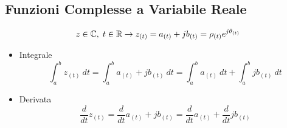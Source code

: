     \subsection{Funzioni Complesse a Variabile Reale}
        \[
           z \in \mathbb{C}, \hspace{0.1cm} t \in \mathbb{R} \rightarrow z_{(t)} = a_{(t)} + jb_{(t)} = \rho_{(t)} e^{j\theta_{(t)}}
        \]
        \begin{itemize}
            \item {Integrale
            \[
                \int_{a}^{b} z_{(t)} \ dt = \int_{a}^{b} a_{(t)} + jb_{(t)} \ dt =\int_{a}^{b} a_{(t)} \ dt+\int_{a}^{b} jb_{(t)} \ dt  
            \]

            }
            \item {Derivata
            \[
                \frac{d}{dt} z_{(t)}= \frac{d}{dt} a_{(t)} + jb_{(t)} =\frac{d}{dt} a_{(t)} +\frac{d}{dt} jb_{(t)}   
            \]

            }
        \end{itemize}
